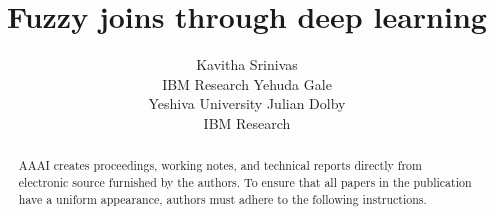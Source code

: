 \documentclass[letterpaper]{article} %
\begin{document}
%
\title{Fuzzy joins through deep learning}


\author{Kavitha Srinivas \\ IBM Research
\And Yehuda Gale \\ Yeshiva University
\And Julian Dolby \\ IBM Research}


\maketitle
\begin{abstract}
AAAI creates proceedings, working notes, and technical reports directly from electronic source furnished by the authors. To ensure that all papers in the publication have a uniform appearance, authors must adhere to the following instructions. 
\end{abstract}




  
  
  
\end{document}
